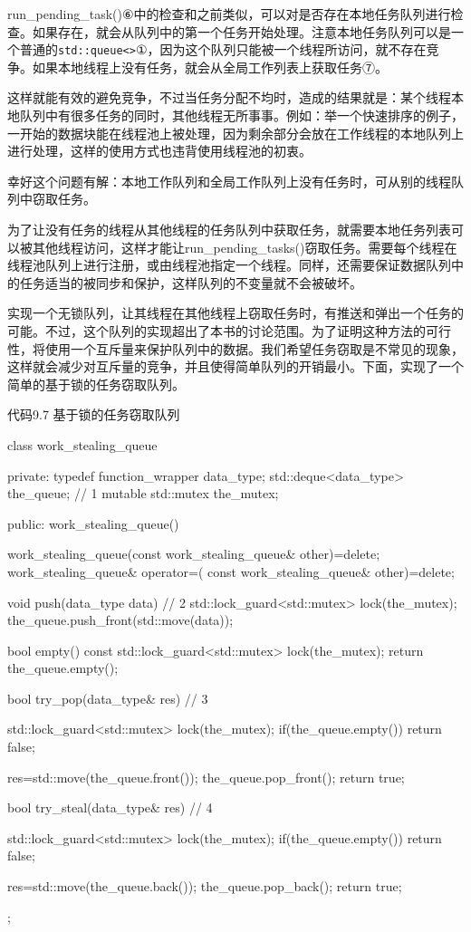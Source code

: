 run\_pending\_task()⑥中的检查和之前类似，可以对是否存在本地任务队列进行检查。如果存在，就会从队列中的第一个任务开始处理。注意本地任务队列可以是一个普通的\texttt{std::queue<>}①，因为这个队列只能被一个线程所访问，就不存在竞争。如果本地线程上没有任务，就会从全局工作列表上获取任务⑦。

这样就能有效的避免竞争，不过当任务分配不均时，造成的结果就是：某个线程本地队列中有很多任务的同时，其他线程无所事事。例如：举一个快速排序的例子，一开始的数据块能在线程池上被处理，因为剩余部分会放在工作线程的本地队列上进行处理，这样的使用方式也违背使用线程池的初衷。

幸好这个问题有解：本地工作队列和全局工作队列上没有任务时，可从别的线程队列中窃取任务。


为了让没有任务的线程从其他线程的任务队列中获取任务，就需要本地任务列表可以被其他线程访问，这样才能让run\_pending\_tasks()窃取任务。需要每个线程在线程池队列上进行注册，或由线程池指定一个线程。同样，还需要保证数据队列中的任务适当的被同步和保护，这样队列的不变量就不会被破坏。

实现一个无锁队列，让其线程在其他线程上窃取任务时，有推送和弹出一个任务的可能。不过，这个队列的实现超出了本书的讨论范围。为了证明这种方法的可行性，将使用一个互斥量来保护队列中的数据。我们希望任务窃取是不常见的现象，这样就会减少对互斥量的竞争，并且使得简单队列的开销最小。下面，实现了一个简单的基于锁的任务窃取队列。

代码9.7 基于锁的任务窃取队列

\begin{cpp}
class work_stealing_queue
{
private:
  typedef function_wrapper data_type;
  std::deque<data_type> the_queue;  // 1
  mutable std::mutex the_mutex;

public:
  work_stealing_queue()
  {}

  work_stealing_queue(const work_stealing_queue& other)=delete;
  work_stealing_queue& operator=(
    const work_stealing_queue& other)=delete;

  void push(data_type data)  // 2
  {
    std::lock_guard<std::mutex> lock(the_mutex);
    the_queue.push_front(std::move(data));
  }

  bool empty() const
  {
    std::lock_guard<std::mutex> lock(the_mutex);
    return the_queue.empty();
  }

  bool try_pop(data_type& res)  // 3
  {
    std::lock_guard<std::mutex> lock(the_mutex);
    if(the_queue.empty())
    {
      return false;
    }

    res=std::move(the_queue.front());
    the_queue.pop_front();
    return true;
  }

  bool try_steal(data_type& res)  // 4
  {
    std::lock_guard<std::mutex> lock(the_mutex);
    if(the_queue.empty())
    {
      return false;
    }

    res=std::move(the_queue.back());
    the_queue.pop_back();
    return true;
  }
};
\end{cpp}

